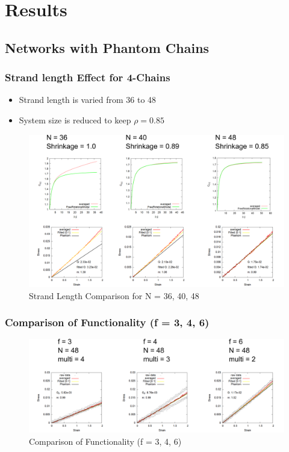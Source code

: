\documentclass[12pt, dvipdfmx]{beamer}
\begin{document}
\section{Results}
\subsection{Networks with Phantom Chains}

\begin{frame}
	\frametitle{
		Strand length Effect for 4-Chains
	}
	\begin{itemize}
		\item Strand length is varied from 36 to 48
		\item System size is reduced to keep $\rho = 0.85$
	\end{itemize}

	\begin{figure}[htb]
		\centering
			\includegraphics[width=.8\textwidth]{N36_N40_N48.png}
			\caption{Strand Length Comparison for N = 36, 40, 48}
			\label{4_N364048}
	\end{figure}
\end{frame}

\begin{frame}
	\frametitle{
		Comparison of Functionality (f = 3, 4, 6)
	}

	\begin{figure}[htb]
		\centering
			\includegraphics[width=.9\textwidth]{compare_346.png}
			\caption{Comparison of Functionality (f = 3, 4, 6)}
			\label{N48_f346}
	\end{figure}

\end{frame}
\end{document}
